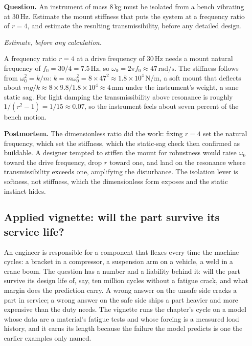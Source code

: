 \begin{estimation}
\textbf{Question.} An instrument of mass $8\,\text{kg}$ must be isolated from a
bench vibrating at $30\,\text{Hz}$. Estimate the mount stiffness that puts the
system at a frequency ratio of $r = 4$, and estimate the resulting
transmissibility, before any detailed design.

\smallskip
\textit{Estimate, before any calculation.}

\smallskip
A frequency ratio $r = 4$ at a drive frequency of $30\,\text{Hz}$ needs a mount
natural frequency of $f_0 = 30/4 = 7.5\,\text{Hz}$, so $\omega_0 = 2\pi f_0
\approx 47\,\text{rad/s}$. The stiffness follows from $\omega_0^2 = k/m$:
$k = m\omega_0^2 = 8 \times 47^2 \approx 1.8\times 10^4\,\si{\newton\per\meter}$,
a soft mount that deflects about $mg/k \approx 8\times 9.8/1.8\times 10^4 \approx
4\,\text{mm}$ under the instrument's weight, a sane static sag. For light damping
the transmissibility above resonance is roughly $1/(r^2 - 1) = 1/15 \approx
0.07$, so the instrument feels about seven percent of the bench motion.

\smallskip
\textbf{Postmortem.} The dimensionless ratio did the work: fixing $r=4$ set the
natural frequency, which set the stiffness, which the static-sag check then
confirmed as buildable. A designer tempted to stiffen the mount for
robustness would raise $\omega_0$ toward the drive frequency, drop $r$ toward
one, and land on the resonance where transmissibility exceeds one, amplifying
the disturbance. The isolation lever is softness, not stiffness, which the
dimensionless form exposes and the static instinct hides.
\end{estimation}

\subsection{Applied vignette: will the part survive its service life?}

An engineer is responsible for a component that flexes every time the machine
cycles: a bracket in a compressor, a suspension arm on a vehicle, a weld in a
crane boom. The question has a number and a liability behind it: will the part
survive its design life of, say, ten million cycles without a fatigue crack, and
what margin does the prediction carry. A wrong answer on the unsafe side cracks a
part in service; a wrong answer on the safe side ships a part heavier and more
expensive than the duty needs. The vignette runs the chapter's cycle on a model
whose data are a material's fatigue tests and whose forcing is a measured load
history, and it earns its length because the failure the model predicts is one
the earlier examples only named.

